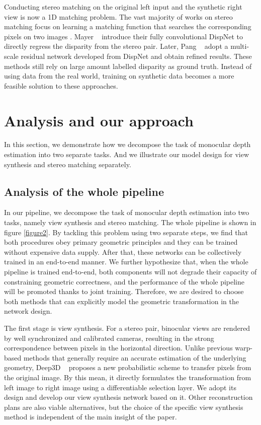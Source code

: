 \documentclass[10pt,twocolumn,letterpaper]{article}
\begin{document}
Conducting stereo matching on the original left input and the synthetic right view is now a 1D matching problem. The vast majority of works on stereo matching focus on learning a matching function that searches the corresponding pixels on two images \cite{lad2015stereo,luo2016stereo}. Mayer \etal~\cite{mayer2016disp} introduce their fully convolutional DispNet to directly regress the disparity from the stereo pair. Later, Pang \etal~\cite{pang2017cascade} adopt a multi-scale residual network developed from DispNet and obtain refined results. These methods still rely on large amount labelled disparity as ground truth. Instead of using data from the real world, training on synthetic data \cite{mayer2016disp} becomes a more feasible solution to these approaches.

\section{Analysis and our approach}
In this section, we demonstrate how we decompose the task of monocular depth estimation into two separate tasks. And we illustrate our model design for view synthesis and stereo matching separately. 

\subsection{Analysis of the whole pipeline}
In our pipeline, we decompose the task of monocular depth estimation into two tasks, namely view synthesis and stereo matching. The whole pipeline is shown in figure \ref{figure2}. By tackling this problem using two separate steps, we find that both procedures obey primary geometric principles and they can be trained without expensive data supply. After that, these networks can be collectively trained in an end-to-end manner. We further hypothesize that, when the whole pipeline is trained end-to-end, both components will not degrade their capacity of constraining geometric correctness, and the performance of the whole pipeline will be promoted thanks to joint training. Therefore, we are desired to choose both methods that can explicitly model the geometric transformation in the network design.

The first stage is view synthesis. For a stereo pair, binocular views are rendered by well synchronized and calibrated cameras, resulting in the strong correspondence between pixels in the horizontal direction. Unlike previous warp-based methods that generally require an accurate estimation of the underlying geometry, Deep3D ~\cite{xie2016deep3d} proposes a new probabilistic scheme to transfer pixels from the original image. By this mean, it directly formulates the transformation from left image to right image using a differentiable selection layer. We adopt its design and develop our view synthesis network based on it. Other reconstruction plans \cite{garg2016unsupervised,godard2016unsupervised,kuznietsov2017semi} are also viable alternatives, but the choice of the specific view synthesis method is independent of the main insight of the paper.
\end{document}
